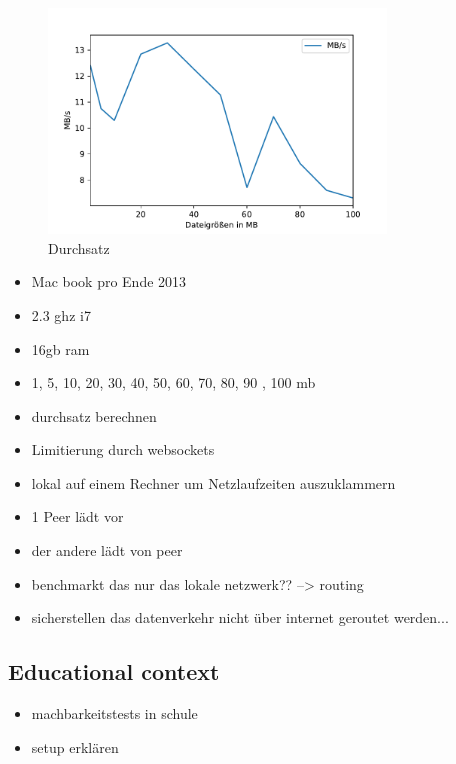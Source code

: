 \begin{figure}[!h]
	\centering
	\includegraphics[width=0.8\textwidth]{figures/durchsatz_file_size}
	\caption[A Figure Short-Title]{Durchsatz}
	\label{fig:durchsatz_file_size}
\end{figure}


\begin{itemize}
	\item Mac book pro Ende 2013
	\item 2.3 ghz i7
	\item 16gb ram
	\item 1, 5, 10, 20, 30, 40, 50, 60, 70, 80, 90 , 100 mb
	\item durchsatz berechnen
	\item Limitierung durch websockets
	\item lokal auf einem Rechner um Netzlaufzeiten auszuklammern
	\item 1 Peer lädt vor
	\item der andere lädt von peer
	\item benchmarkt das nur das lokale netzwerk?? --> routing
	\item sicherstellen das datenverkehr nicht über internet geroutet werden...
\end{itemize}
\subsection{Educational context}
\begin{itemize}
	\item machbarkeitstests in schule
	\item setup erklären
	
\end{itemize}

